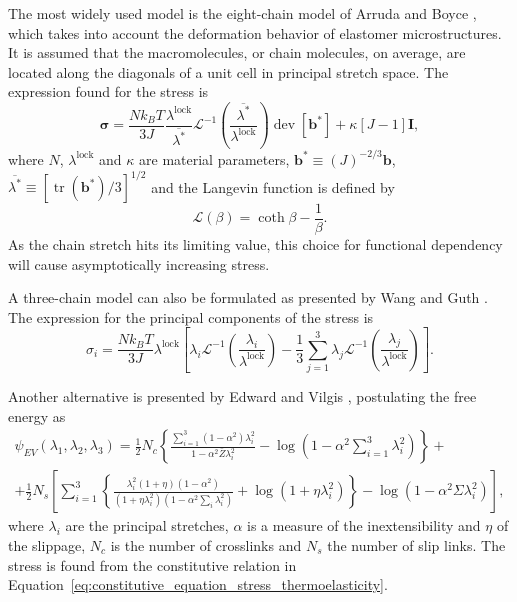The most widely used model is the eight-chain model of Arruda and Boyce \citep{arrudaEvolutionPlasticAnisotropy1993, arrudaEffectsStrainRate1995}, which takes into account the deformation behavior of elastomer microstructures.
It is assumed that the macromolecules, or chain molecules, on average, are located along the diagonals of a unit cell in principal stretch space.
The expression found for the stress is
\begin{equation}
	\label{eq:eigth_chain_model}
	\bm \sigma = \frac{Nk_BT}{3J} \frac{\lambda^\text{lock}}{\overline{\lambda^*}}\mathcal L^{-1}\left(\frac{\overline{\lambda^*}}{\lambda^\text{lock}}\right)\operatorname{dev} [\mathbf b^*] + \kappa [J-1]\mathbf I,
\end{equation}
where $N$, $\lambda^\text{lock}$ and $\kappa$ are material parameters, $\mathbf b^*\equiv (J)^{-2/3}\mathbf b$, $\overline{\lambda^*}\equiv [\operatorname{tr}(\mathbf b^*)/3]^{1/2}$ and the Langevin function is defined by
\begin{equation}
	\mathcal L(\beta) = \coth \beta - \frac{1}{\beta}.
\end{equation}
As the chain stretch hits its limiting value, this choice for functional dependency will cause asymptotically increasing stress.

A three-chain model can also be formulated as presented by Wang and Guth \citep{wangStatisticalTheoryNetworks1952}.
The expression for the principal components of the stress is
\begin{equation}
	\label{eq:three_chain_model}
	\sigma_i=\frac{Nk_B T}{3J} \lambda^\text{lock} \left[\lambda_i \mathcal L^{-1}\left(\frac{\lambda_i}{\lambda^\text{lock}}\right) - \frac{1}{3} \sum_{j=1}^3 \lambda_j \mathcal L^{-1}\left(\frac{\lambda_j}{\lambda^\text{lock}}\right)\right].
\end{equation}

Another alternative is presented by Edward and Vilgis \citep{edwardsEffectEntanglementsRubber1986}, postulating the free energy as
\begin{multline}
  \label{eq:edward_vilgis_model}
	\psi_{EV}(\lambda_1, \lambda_2, \lambda_3) = \frac{1}{2} N_c\left\{\frac{\sum_{i=1}^3\left(1-\alpha^2\right) \lambda_i^2}{1-\alpha^2 \bar{Z} \lambda_i^2}-\log \left(1-\alpha^2 \sum_{i=1}^3 \lambda_i^2\right)\right\}+ \\
	+\frac{1}{2} N_s\left[\sum_{i=1}^3\left\{\frac{\lambda_i^2(1+\eta)\left(1-\alpha^2\right)}{\left(1+\eta \lambda_i^2\right)\left(1-\alpha^2 \sum_i \lambda_i^2\right)}+\log \left(1+\eta \lambda_i^2\right)\right\}-\log \left(1-\alpha^2 \Sigma \lambda_i^2\right)\right],
\end{multline}
where $\lambda_i$ are the principal stretches, $\alpha$ is a measure of the inextensibility and $\eta$ of the slippage, $N_c$ is the number of crosslinks and $N_s$ the number of slip links.
The stress is found from the constitutive relation in Equation~\eqref{eq:constitutive_equation_stress_thermoelasticity}.

